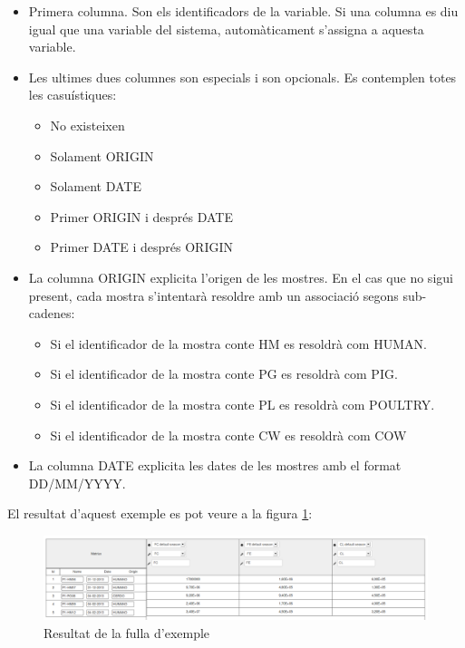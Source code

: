 \begin{itemize}
\item Primera columna. Son els identificadors de la variable. Si una columna es diu igual que una variable del sistema, automàticament s'assigna a aquesta variable.
\item Les ultimes dues columnes son especials i son opcionals. Es contemplen totes les casuístiques:
\begin{itemize}
\item No existeixen
\item Solament ORIGIN
\item Solament DATE
\item Primer ORIGIN i després DATE
\item Primer DATE i després ORIGIN
\end{itemize}
\item La columna ORIGIN explicita l'origen de les mostres. En el cas que no sigui present, cada mostra s'intentar\`{a} resoldre  amb un associació segons sub-cadenes:
\begin{itemize}
\item Si el identificador de la mostra conte HM es resoldrà com HUMAN.
\item Si el identificador de la mostra conte PG es resoldrà com PIG.
\item Si el identificador de la mostra conte PL es resoldrà com POULTRY.
\item Si el identificador de la mostra conte CW es resoldrà com COW
\end{itemize}
\item La columna DATE explicita les dates de les mostres amb el format DD/MM/YYYY.
\end{itemize}

El resultat d'aquest exemple es pot veure a la figura \ref{fig:matrixResulting}:
\begin{figure}[h!]
  \centering
  \includegraphics[scale=0.3]{img/userguide/matrix_resulting.png}
  \caption{Resultat de la fulla d'exemple}
  \label{fig:matrixResulting}
\end{figure}

